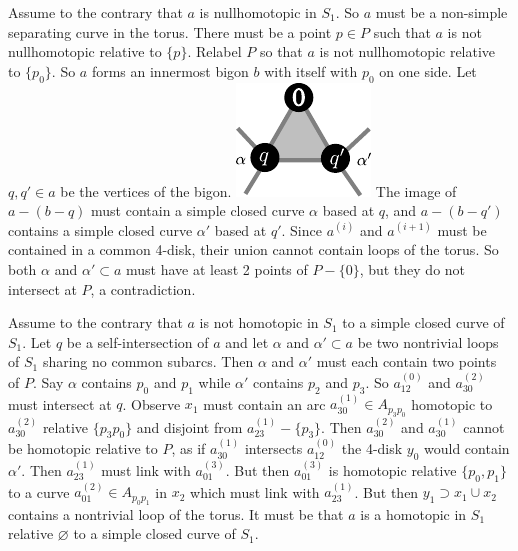 \documentclass[11pt]{article}
\theoremstyle{remark}
\theoremstyle{definition}
\begin{document}
Assume to the contrary that $a$ is nullhomotopic in $S_1$.
So $a$ must be a non-simple separating curve in the torus.
There must be a point $p \in P$
such that $a$ is not nullhomotopic relative to $\{p\}$.
Relabel $P$ so that $a$ is not nullhomotopic relative to $\{p_0\}$.
So $a$ forms an innermost bigon $b$ with itself with $p_0$ on one side.
Let $q,q' \in a$ be the vertices of the bigon.
\includegraphics[width=.5\textwidth]{figures/abigon.pdf}
The image of $a-(b-q)$ must contain a simple closed curve $\alpha$ based
at $q$,
and
$a-(b-q')$ contains a simple closed curve $\alpha'$ based
at $q'$.
Since $a^{(i)}$ and $a^{(i+1)}$ must be contained in a common 4-disk,
their union cannot contain loops of the torus.
So both $\alpha$ and $\alpha'\subset a$
must have at least 2 points of $P -\{0\}$, but
they do not intersect at $P$, a contradiction.

Assume to the contrary that $a$ is not homotopic in $S_1$
to a simple closed curve of $S_1$.
Let $q$ be a self-intersection of $a$
and let $\alpha$ and $\alpha' \subset a$ be two nontrivial loops of $S_1$
sharing no common subarcs.
Then $\alpha$ and $\alpha'$ must each contain two points of $P$.
Say $\alpha$ contains $p_0$ and $p_1$ while $\alpha'$ contains $p_2$ and $p_3$.
So $a^{(0)}_{12}$ and $a^{(2)}_{30}$
must intersect at $q$.
Observe $x_1$ must contain an arc $a^{(1)}_{30} \in A_{p_3p_0}$
homotopic to $a^{(2)}_{30}$ relative $\{p_3p_0\}$
and disjoint from $a^{(1)}_{23} - \{p_3\}$.
Then $a^{(2)}_{30}$ and $a^{(1)}_{30}$ cannot be homotopic relative to $P$,
as if $a^{(1)}_{30}$ intersects $a^{(0)}_{12}$
the 4-disk $y_0$ would contain $\alpha'$.
Then $a^{(1)}_{23}$ must
link with $a^{(3)}_{01}$.
But then $a^{(3)}_{01}$ is homotopic relative $\{p_0,p_1\}$
to a curve
$a^{(2)}_{01} \in A_{p_0p_1}$ in $x_2$ which must link with $a^{(1)}_{23}$.
But then $y_1 \supset x_1\cup x_2$ contains a nontrivial loop of the torus.
It must be that $a$ is a homotopic in $S_1$ relative
$\varnothing$ to a simple closed curve of $S_1$.
\end{document}
